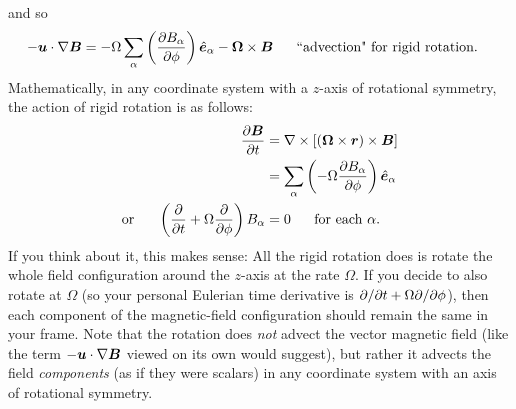 \documentclass[12pt]{article}
\newcommand{\vecrot}{\bm{\Omega}}
\newcommand{\vecr}{\bm{r}}
\begin{document}
and so
\begin{align}
	-\vecu\dotgrad\vecb &= -\Omega\sum_\alpha\left(\pderiv{B_\alpha}{\phi}\right)\e_\alpha-\vecrot\times\vecb \five \text{``advection" for rigid rotation}.
\end{align}
Mathematically, in any coordinate system with a $z$-axis of rotational symmetry, the action of rigid rotation is as follows:
\begin{subequations}
\begin{align}
	\pderiv{\vecb}{t}&=\curl[(\vecrot\times\vecr)\times\vecb]\nonumber\\
	&= \sum_\alpha\left(-\Omega\pderiv{B_\alpha}{\phi}\right)\e_\alpha \label{eq:rottransport1}\\
	\orr \left(\pderiv{}{t}+\Omega\pderiv{}{\phi}\right)B_\alpha&=0\five\text{for each $\alpha$}.\label{eq:rottransport2}
\end{align}
\end{subequations}
If you think about it, this makes sense: All the rigid rotation does is rotate the whole field configuration around the $z$-axis at the rate $\Omega$. If you decide to also rotate at $\Omega$ (so your personal Eulerian time derivative is $\partial/\partial t+\Omega\partial/\partial\phi$), then each component of the magnetic-field configuration should remain the same in your frame. Note that the rotation does \textit{not} advect the vector magnetic field (like the term $-\bm{u}\cdot\nabla\bm{B}$ viewed on its own would suggest), but rather it advects the field \textit{components} (as if they were scalars) in any coordinate system with an axis of rotational symmetry. 
\end{document}

